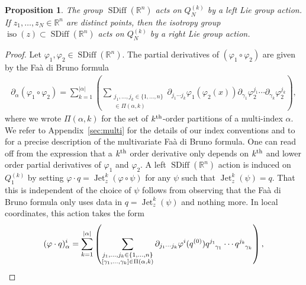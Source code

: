 \documentclass[12pt]{amsart}
\newcommand{\R}{\ensuremath{\mathbb{R}}}
\newtheorem{prop}[thm]{Proposition}
\DeclareMathOperator{\SDiff}{SDiff}
\DeclareMathOperator{\Jet}{Jet}
\DeclareMathOperator{\iso}{iso}
\begin{document}
  \begin{prop}
    The group $\SDiff(\R^n)$ acts on $Q_N^{(k)}$ by a left Lie group
    action.  If $z_1,\dots,z_N \in \R^n$ are distinct points,
    then the isotropy group $\iso(z) \subset \SDiff(\R^n)$
    acts on $Q_N^{(k)}$ by a right Lie group action. \label{HL_action_prop}
  \end{prop}
  \begin{proof}
    Let $\varphi_1,\varphi_2 \in \SDiff(\R^n)$.
    The partial derivatives of $(\varphi_1 \circ \varphi_2)$
    are given by the Fa\`a di Bruno formula
    \begin{align*}
      \partial_\alpha( \varphi_1 \circ \varphi_2) = \sum_{k=1}^{|\alpha|}
      \left(
        \sum_{
        \substack{
          j_1,\dots,j_k \in \{1,\dots,n\} \\
          [\gamma_1,\dots,\gamma_k] \in \Pi(\alpha , k)
          }
          }
          \partial_{j_1 \cdots j_k} \varphi_1(\varphi_2(x))
          \partial_{\gamma_1} \varphi_2^{j_1} \cdots
          \partial_{\gamma_k} \varphi_2^{j_k}
        \right),
    \end{align*}
where we wrote $\Pi(\alpha, k)$ for the set of $k^{\rm th}$-order partitions of a multi-index $\alpha$. We refer to Appendix~\ref{sec:multi} for the details of our index conventions and to \cite{ConstantineSavits1996,Jacobs2014b} for a
    precise description of the multivariate Fa\`a di Bruno formula.
    One can read off   from the expression that
    a $k^{\rm th}$ order derivative only depends on $k^{\rm th}$
    and lower order
    partial derivatives of $\varphi_1$ and $\varphi_2$.
        A left $\SDiff(\R^n)$ action is induced on $Q_1^{(k)}$ by
    setting $\varphi \cdot q = \Jet^k_z( \varphi \circ \psi)$
    for any $\psi$ such that $\Jet^k_z(\psi) = q$.
    That this is independent of the choice of $\psi$ follows
    from observing that the Fa\`a di Bruno formula
    only uses data in $q = \Jet^k_z(\psi)$ and nothing more.
    In local coordinates, this action takes the form
    \begin{align*}
    (\varphi \cdot q)^i_\alpha =
     \sum_{k=1}^{|\alpha|}
      \left(
        \sum_{
        \substack{
          j_1,\dots,j_k \in \{1,\dots,n\} \\
          [\gamma_1,\dots,\gamma_k] \in \Pi(\alpha , k)
          }
          }
          \partial_{j_1 \cdots j_k} \varphi^i(q^{(0)})
          q\indices{^{j_1}_{\gamma_1}} \cdots
          q\indices{^{j_k}_{\gamma_k}}
        \right),
    \end{align*}

\end{proof}
\end{document}
